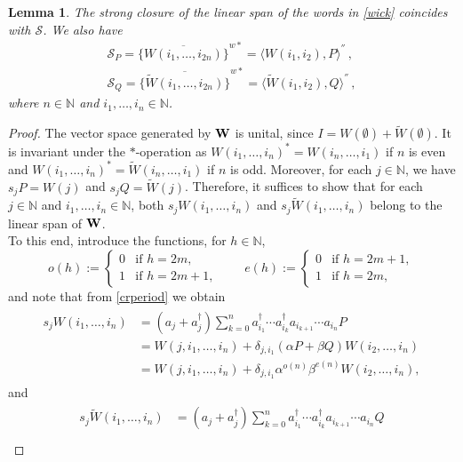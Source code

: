 \documentclass[12pt]{amsart}
\numberwithin{equation}{section}
\def\bn{{\mathbb N}}
\def\a{\alpha}
\def\b{\beta}
\def\d{\delta}  \def\D{\Delta}
\newtheorem{lem}[thm]{Lemma}
\theoremstyle{definition}
\begin{document}
\begin{lem}\label{wickformula0}
The strong closure of the linear span of the words in \eqref{wick} coincides with $\mathcal{S}$. We also have
  \begin{eqnarray}\label{sub}
    \mathcal{S}_P=\overline{\{W(i_1,\ldots, i_{2n})\}}^{w*}=\langle
      W(i_1,i_2),P\rangle^{''}\,, \\\label{sub2} \mathcal{S}_Q=\overline{\{\widetilde W(i_1,\ldots, i_{2n})\}}^{w*}=\langle \widetilde{W}(i_1,i_2),Q\rangle^{''}\,,
\end{eqnarray}
where $n\in\bn$ and $i_1,\ldots,i_n\in\bn$.
\end{lem}
\begin{proof}
  The vector space generated by $\bf{W}$ is unital, since $I=W(\emptyset)+\widetilde{W}(\emptyset)$. It is invariant under the $*$-operation
  as $W(i_1,\ldots, i_n)^*=W(i_n,\ldots, i_1)$ if $n$ is even and
 $W(i_1,\ldots, i_n)^*=\widetilde W(i_n,\ldots, i_1)$ if $n$ is odd. Moreover, for each $j\in\bn$, we have $s_jP=W(j)$ and $s_jQ=\widetilde{W}(j)$. Therefore, it suffices to show that for each $j\in\bn$ and $i_1,\ldots, i_n\in\bn$, both $s_jW(i_1,\ldots, i_n)$ and $s_j\widetilde{W}(i_1,\ldots,i_n)$ belong to the linear span of $\bf{W}$.\\
To this end, introduce the functions, for $h\in\bn$,
$$
o(h):=\begin{cases}0 &\text{if }h=2m,\\
1&\text{if }h=2m+1,
\end{cases}\qquad
e(h):=\begin{cases}0 &\text{if }h=2m+1,\\
1&\text{if }h=2m,
\end{cases}
$$
and note that from \eqref{crperiod} we obtain
\begin{align}
\begin{split}
\label{swick1}
s_jW(i_1,\ldots, i_n)
&=(a_j+a^\dag_{j}) \sum_{k=0}^n a^\dag_{i_1}\cdots a^\dag_{i_k}a_{i_{k+1}}\cdots a_{i_n}P\\
&=W(j,i_1,\ldots,i_n)+\d_{j,i_1}(\a P+\b Q)W(i_2,\ldots,i_n)\\
&=W(j,i_1,\ldots,i_n)+\d_{j,i_1}\a^{o(n)}\b^{e(n)}W(i_2,\ldots,i_n),
\end{split}
\end{align}
and
\begin{align}
\begin{split}
\label{swick2}
s_j\widetilde{W}(i_1,\ldots, i_n)
&=(a_j+a^\dag_{j}) \sum_{k=0}^n a^\dag_{i_1}\cdots a^\dag_{i_k}a_{i_{k+1}}\cdots a_{i_n}Q\\

\end{split}
\end{align}
\end{proof}
\end{document}
